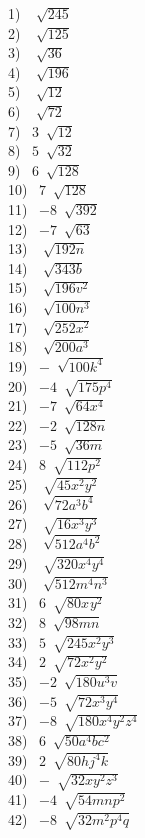 \documentclass[12pt]{book}
\theoremstyle{definition}
\begin{document}
\begin{multicols}{4}
	1)~ $\sqrt[]{245}$\\
	2)~ $\sqrt[]{125}$\\
  3)~ $\sqrt[]{36}$\\
  4)~ $\sqrt[]{196}$\\
  5)~ $\sqrt[]{12}$\\
  6)~ $\sqrt[]{72}$\\
  7)~ $3~\sqrt[]{12}$\\
  8)~ $5~\sqrt[]{32}$\\
  9)~ $6~\sqrt[]{128}$\\
  10)~ $7~\sqrt[]{128}$\\
  11)~ $- 8~\sqrt[]{392}$\\
  12)~ $- 7~\sqrt[]{63}$\\
  13)~ $\sqrt[]{192 n}$\\
  14)~ $\sqrt[]{343 b}$\\
  15)~ $\sqrt[]{196 v^2}$\\
  16)~ $\sqrt[]{100 n^3}$\\
  17)~ $\sqrt[]{252 x^2}$\\
  18)~ $\sqrt[]{200 a^3}$\\
  19)~ $-~\sqrt[]{100 k^4}$\\
  20)~ $- 4~\sqrt[]{175 p^4}$\\
  21)~ $- 7~\sqrt[]{64 x^4}$\\
  22)~ $- 2~\sqrt[]{128 n}$\\
  23)~ $- 5~\sqrt[]{36 m}$\\
  24)~ $8~\sqrt[]{112 p^2}$\\
  25)~ $\sqrt[]{45 x^2 y^2}$\\
  26)~ $\sqrt[]{72 a^3 b^4}$\\
  27)~ $\sqrt[]{16 x^3 y^3}$\\
  28)~ $\sqrt[]{512 a^4 b^2}$\\
  29)~ $\sqrt[]{320 x^4 y^4}$\\
  30)~ $\sqrt[]{512 m^4 n^3}$\\
  31)~ $6~\sqrt[]{80 x^{} y^2}$\\
  32)~ $8~\sqrt[]{98 m n}$\\
  33)~ $5~\sqrt[]{245 x^2 y^3}$\\
  34)~ $2~\sqrt[]{72 x^2 y^2}$\\
  35)~ $- 2~\sqrt[]{180 u^3 v}$\\
  36)~ $- 5~\sqrt[]{72 x^3 y^4}$\\
  37)~ $- 8~\sqrt[]{180 x^4 y^2 z^4}$\\
  38)~ $6~\sqrt[]{50 a^4 b c^2}$\\
  39)~ $2~\sqrt[]{80 h j^4 k}$\\
  40)~ $-~\sqrt[]{32 x y^2 z^3}$\\
  41)~ $- 4~\sqrt[]{54 m n p^2}$\\
  42)~ $- 8~\sqrt[]{32 m^2 p^4 q}$
\end{multicols}
\end{document}
